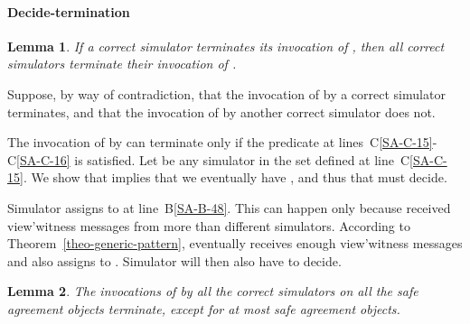 \documentclass[11pt,letterpaper]{article}
\newtheorem{lemma}{Lemma}
\newlength {\afterproof}
\newcommand{\toto}{xxx}
\newenvironment{proofL}{\noindent{\bf Proof }}
{\hspace*{\fill}\par\vspace{\afterproof}}
\begin{document}
\paragraph{Decide-termination}

\begin{lemma}
\label{lemma:one-decides-all-decide}
If a correct simulator terminates its invocation of , 
then all correct simulators terminate their invocation of .
\end{lemma}

\begin{proofL}
Suppose, by way of contradiction, that the invocation of 
by a correct simulator  terminates, and that the invocation of 
 by another correct simulator  does not.

The invocation of  by  can terminate only if 
the predicate at lines~C\ref{SA-C-15}-C\ref{SA-C-16} is satisfied.
Let  be any simulator in the set  defined at 
line~C\ref{SA-C-15}. We  show that  implies that 
we  eventually have , and thus that  must 
decide.

Simulator  assigns  to  at line~B\ref{SA-B-48}. 
This can happen only because  received 
{\sc view'witness} messages from more than 
 different simulators. According to 
Theorem~\ref{theo-generic-pattern},    eventually  receives
enough {\sc view'witness} messages
and  also assigns  to . Simulator
 will then also have to decide.
\renewcommand{\toto}{lemma:one-decides-all-decide}
\end{proofL}

\begin{lemma}
\label{lemma:at-most-one-blocked-byz}
The invocations of  by all the correct simulators 
on all the safe agreement objects terminate, except for at most 
safe agreement objects.
\end{lemma}
\end{document}
